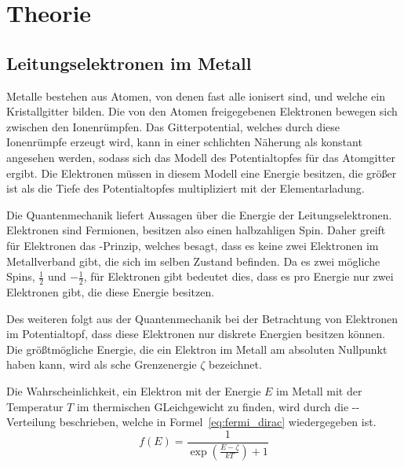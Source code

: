 
\section{Theorie}
%
\subsection{Leitungselektronen im Metall}
%
Metalle bestehen aus Atomen, von denen fast alle ionisert sind, und
welche ein Kristallgitter bilden. Die von den Atomen freigegebenen
Elektronen bewegen sich zwischen den Ionenrümpfen.  Das Gitterpotential,
welches durch diese Ionenrümpfe erzeugt wird, kann in einer schlichten
Näherung als konstant angesehen werden, sodass sich das Modell des
Potentialtopfes für das Atomgitter ergibt. Die Elektronen müssen in
diesem Modell eine Energie besitzen, die größer ist als die Tiefe des
Potentialtopfes multipliziert mit der Elementarladung.

Die Quantenmechanik liefert Aussagen über die Energie der
Leitungselektronen.  Elektronen sind Fermionen, besitzen also einen
halbzahligen Spin. Daher greift für Elektronen das -Prinzip,
welches besagt, dass es keine zwei Elektronen im Metallverband gibt, die
sich im selben Zustand befinden. Da es zwei mögliche Spins,
$\frac{1}{2}$ und $-\frac{1}{2}$, für Elektronen gibt bedeutet dies,
dass es pro Energie nur zwei Elektronen gibt, die diese Energie
besitzen.

Des weiteren folgt aus der Quantenmechanik bei der Betrachtung von
Elektronen im Potentialtopf, dass diese Elektronen nur diskrete Energien
besitzen können. Die größtmögliche Energie, die ein Elektron im Metall
am absoluten Nullpunkt haben kann, wird als sche
Grenzenergie $\zeta$ bezeichnet.

Die Wahrscheinlichkeit, ein Elektron mit der Energie $E$ im Metall mit
der Temperatur $T$ im thermischen GLeichgewicht zu finden, wird durch
die --Verteilung beschrieben, welche in
Formel~\eqref{eq:fermi_dirac} wiedergegeben ist.
\begin{equation}
f(E) = \frac{1}{\exp{\left(\frac{E - \zeta}{kT}\right)}+1}
\label{eq:fermi_dirac}
\end{equation}
%
